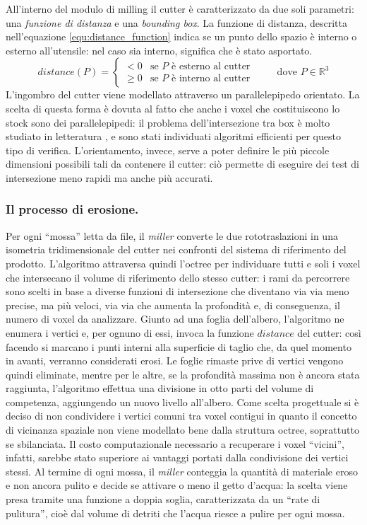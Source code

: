 All'interno del modulo di milling il cutter è caratterizzato da due soli parametri: una \emph{funzione di distanza} e una \emph{bounding box}. La funzione di distanza, descritta nell'equazione \eqref{equ:distance_function} indica se un punto dello spazio è interno o esterno all'utensile: nel caso sia interno, significa che è stato asportato.
\begin{equation} \label{equ:distance_function}
	distance(P) = 
		\begin{cases}
			< 0 & \text{se $P$ è esterno al cutter} \\
			\geq 0 & \text{se $P$ è interno al cutter}
		\end{cases}
	\qquad \text{ dove } P \in \mathbb{R}^3
\end{equation}
L'ingombro del cutter viene modellato attraverso un parallelepipedo orientato. La scelta di questa forma è dovuta al fatto che anche i voxel che costituiscono lo stock sono dei parallelepipedi: il problema dell'intersezione tra box è molto studiato in letteratura \cite{eberly_OBBCollision}, e sono stati individuati algoritmi efficienti per questo tipo di verifica. L'orientamento, invece, serve a poter definire le più piccole dimensioni possibili tali da contenere il cutter: ciò permette di eseguire dei test di intersezione meno rapidi ma anche più accurati.

\subsubsection{Il processo di erosione.}
Per ogni ``mossa'' letta da file, il \emph{miller} converte le due rototraslazioni in una isometria tridimensionale del cutter nei confronti del sistema di riferimento del prodotto. L'algoritmo attraversa quindi l'octree per individuare tutti e soli i voxel che intersecano il volume di riferimento dello stesso cutter: i rami da percorrere sono scelti in base a diverse funzioni di intersezione che diventano via via meno precise, ma più veloci, via via che aumenta la profondità e, di conseguenza, il numero di voxel da analizzare. Giunto ad una foglia dell'albero, l'algoritmo ne enumera i vertici e, per ognuno di essi, invoca la funzione $distance$ del cutter: così facendo si marcano i punti interni alla superficie di taglio che, da quel momento in avanti, verranno considerati erosi.
Le foglie rimaste prive di vertici vengono quindi eliminate, mentre per le altre, se la profondità massima non è ancora stata raggiunta, l'algoritmo effettua una divisione in otto parti del volume di competenza, aggiungendo un nuovo livello all'albero. Come scelta progettuale si è deciso di non condividere i vertici comuni tra voxel contigui in quanto il concetto di vicinanza spaziale non viene modellato bene dalla struttura octree, soprattutto se sbilanciata. Il costo computazionale necessario a recuperare i voxel ``vicini'', infatti, sarebbe stato superiore ai vantaggi portati dalla condivisione dei vertici stessi. Al termine di ogni mossa, il \emph{miller} conteggia la quantità di materiale eroso e non ancora pulito e decide se attivare o meno il getto d'acqua: la scelta viene presa tramite una funzione a doppia soglia, caratterizzata da un ``rate di pulitura'', cioè dal volume di detriti che l'acqua riesce a pulire per ogni mossa.

